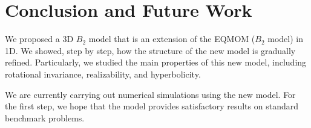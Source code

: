 
\section{Conclusion and Future Work}\label{sec:conclude}

We proposed a 3D $B_2$ model that is an extension of the EQMOM ($B_2$
model) in 1D. We showed, step by step, how the structure of the new
model is gradually refined. Particularly, we studied the main
properties of this new model, including rotational invariance,
realizability, and hyperbolicity.

We are currently carrying out numerical simulations using the new
model. For the first step, we hope that the model provides 
satisfactory results on standard benchmark problems.

